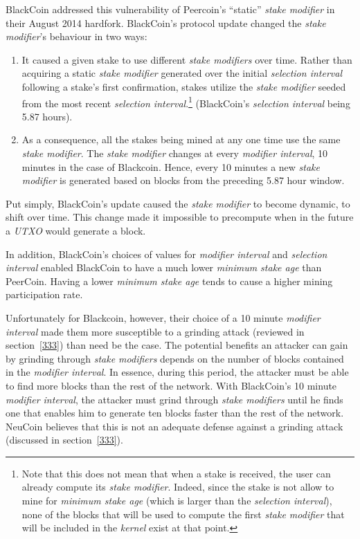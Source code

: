 \documentclass[a4paper,11pt]{article}
\begin{document}
BlackCoin addressed this vulnerability of Peercoin's ``static'' \textit{stake modifier} in their August 2014 hardfork. BlackCoin's protocol update changed the \textit{stake modifier}'s behaviour in two ways:
\begin{enumerate}
\setlength{\itemsep}{0pt}
\item{It caused a given stake to use different \textit{stake modifiers} over time. Rather than acquiring a static \textit{stake modifier} generated over the initial \textit{selection interval} following a stake's first confirmation, stakes utilize the \textit{stake modifier} seeded from the most recent \textit{selection interval}.\footnote{Note that this does not mean that when a stake is received, the user can already compute its \textit{stake modifier}. Indeed, since the stake is not allow to mine for \textit{minimum stake age} (which is larger than the \textit{selection interval}), none of the blocks that will be used to compute the first \textit{stake modifier} that will be included in the \textit{kernel} exist at that point.} (BlackCoin's \textit{selection interval} being 5.87 hours).}
\item{As a consequence, all the stakes being mined at any one time use the same \textit{stake modifier}. The \textit{stake modifier} changes at every \textit{modifier interval}, 10 minutes in the case of Blackcoin. Hence, every 10 minutes a new \textit{stake modifier} is generated based on blocks from the preceding 5.87 hour window.}
\end{enumerate}

Put simply, BlackCoin's update caused the \textit{stake modifier} to become dynamic, to shift over time. This change made it impossible to precompute when in the future a \textit{UTXO} would generate a block. 

In addition, BlackCoin's choices of values for \textit{modifier interval} and \textit{selection interval} enabled BlackCoin to have a much lower \textit{minimum stake age} than PeerCoin. Having a lower \textit{minimum stake age} tends to cause a higher mining participation rate.

Unfortunately for Blackcoin, however, their choice of a 10 minute \textit{modifier interval} made them more susceptible to a grinding attack (reviewed in section~\ref{333}) than need be the case. The potential benefits an attacker can gain by grinding through \textit{stake modifiers} depends on the number of blocks contained in the \textit{modifier interval}. In essence, during this period, the attacker must be able to find more blocks than the rest of the network. With BlackCoin's 10 minute \textit{modifier interval}, the attacker must grind through \textit{stake modifiers} until he finds one that enables him to generate ten blocks faster than the rest of the network. NeuCoin believes that this is not an adequate defense against a grinding attack (discussed in section~\ref{333}).
\end{document}
